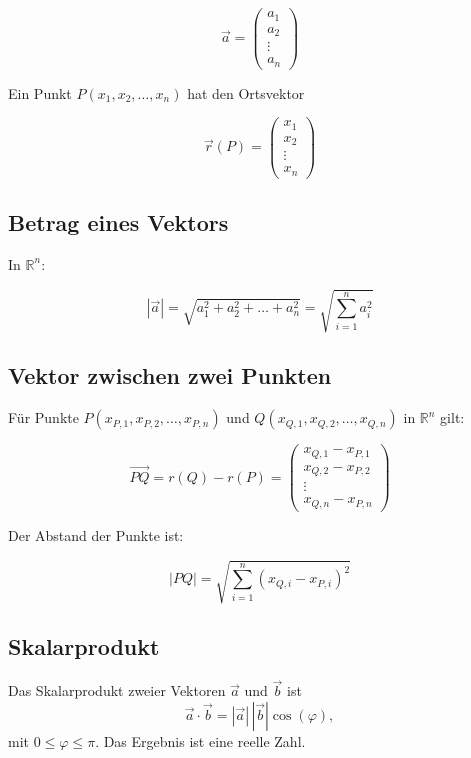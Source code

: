 \[
     \vec a =
     \begin{pmatrix}
          a_1    \\
          a_2    \\
          \vdots \\
          a_n
     \end{pmatrix}
\]

Ein Punkt $P(x_1, x_2, \dots, x_n)$ hat den Ortsvektor

\[
     \vec r(P) =
     \begin{pmatrix}
          x_1    \\
          x_2    \\
          \vdots \\
          x_n
     \end{pmatrix}
\]

\subsection{Betrag eines Vektors}

In $\mathbb{R}^n$:

\[
     |\vec a| = \sqrt{a_1^2 + a_2^2 + \dots + a_n^2} = \sqrt{\sum_{i=1}^{n} a_i^2}
\]

\subsection{Vektor zwischen zwei Punkten}

Für Punkte $P(x_{P,1}, x_{P,2}, \dots, x_{P,n})$ und $Q(x_{Q,1}, x_{Q,2}, \dots, x_{Q,n})$ in $\mathbb{R}^n$ gilt:

\[
     \overrightarrow{PQ} = r(Q) - r(P) =
     \begin{pmatrix}
          x_{Q,1} - x_{P,1} \\
          x_{Q,2} - x_{P,2} \\
          \vdots            \\
          x_{Q,n} - x_{P,n}
     \end{pmatrix}
\]

Der Abstand der Punkte ist:

\[
     |PQ| = \sqrt{\sum_{i=1}^{n} (x_{Q,i}-x_{P,i})^2}
\]



\subsection{Skalarprodukt}

Das Skalarprodukt zweier Vektoren $\vec a$ und $\vec b$ ist
\[
     \vec a \cdot \vec b = |\vec a|\,|\vec b|\cos(\varphi),
\]
mit $0 \le \varphi \le \pi$. Das Ergebnis ist eine reelle Zahl.

